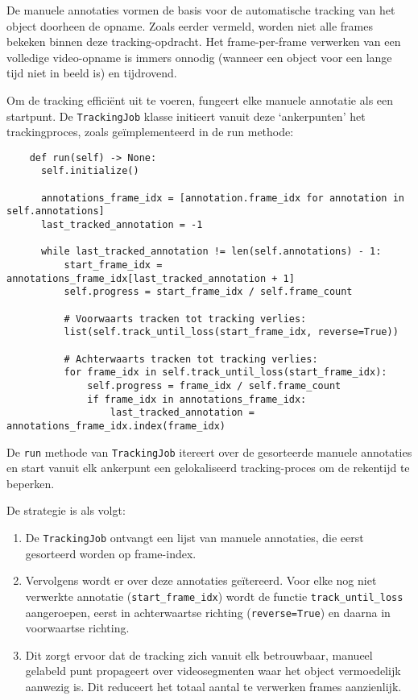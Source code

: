 De manuele annotaties vormen de basis voor de automatische tracking van het object doorheen de opname.
Zoals eerder vermeld, worden niet alle frames bekeken binnen deze tracking-opdracht.
Het frame-per-frame verwerken van een volledige video-opname is immers onnodig (wanneer een object voor een lange tijd niet in beeld is) en tijdrovend.

Om de tracking efficiënt uit te voeren, fungeert elke manuele annotatie als een startpunt. 
De \texttt{TrackingJob} klasse initieert vanuit deze `ankerpunten' het trackingproces, zoals geïmplementeerd in de run methode:

\begin{listing}[H]
  \begin{verbatim}
    def run(self) -> None:
      self.initialize()

      annotations_frame_idx = [annotation.frame_idx for annotation in self.annotations]
      last_tracked_annotation = -1

      while last_tracked_annotation != len(self.annotations) - 1:
          start_frame_idx = annotations_frame_idx[last_tracked_annotation + 1]
          self.progress = start_frame_idx / self.frame_count

          # Voorwaarts tracken tot tracking verlies:
          list(self.track_until_loss(start_frame_idx, reverse=True))

          # Achterwaarts tracken tot tracking verlies:
          for frame_idx in self.track_until_loss(start_frame_idx):
              self.progress = frame_idx / self.frame_count
              if frame_idx in annotations_frame_idx:
                  last_tracked_annotation = annotations_frame_idx.index(frame_idx)
  \end{verbatim}
  \caption[Kernlogica van de \texttt{TrackingJob} voor efficiënte verwerking]{
    De \texttt{run} methode van \texttt{TrackingJob} itereert over de gesorteerde manuele annotaties en start vanuit elk ankerpunt een 
    gelokaliseerd tracking-proces om de rekentijd te beperken.
  }
\end{listing}

De strategie is als volgt:
\begin{enumerate}
\item De \texttt{TrackingJob} ontvangt een lijst van manuele annotaties, die eerst gesorteerd worden op frame-index.
\item Vervolgens wordt er over deze annotaties geïtereerd. Voor elke nog niet verwerkte annotatie (\texttt{start\_frame\_idx}) 
wordt de functie \texttt{track\_until\_loss}\\ aangeroepen, eerst in achterwaartse richting (\texttt{reverse=True}) en daarna in voorwaartse richting.
\item Dit zorgt ervoor dat de tracking zich vanuit elk betrouwbaar, manueel gelabeld punt propageert over videosegmenten waar het object vermoedelijk aanwezig is. 
Dit reduceert het totaal aantal te verwerken frames aanzienlijk.
\end{enumerate}

